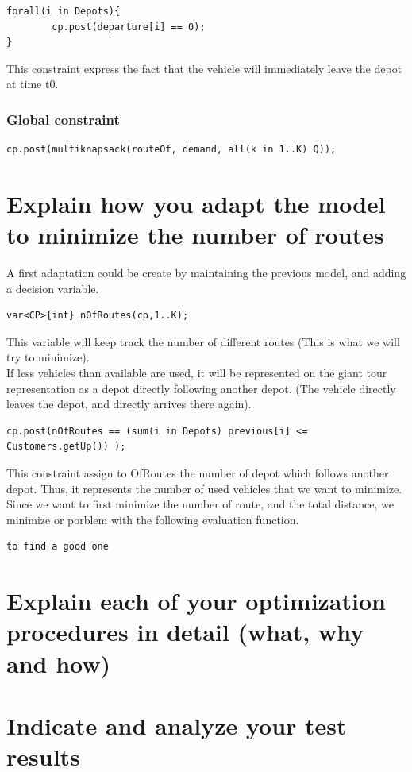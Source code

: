 \documentclass[a4paper ,12pt,french]{article}
\begin{document}
		
\begin{verbatim}
forall(i in Depots){
        cp.post(departure[i] == 0);
}
\end{verbatim}
This constraint express the fact that the vehicle will immediately leave the depot at time t0.


\subsubsection*{Global constraint}
\begin{verbatim}
cp.post(multiknapsack(routeOf, demand, all(k in 1..K) Q));
\end{verbatim}


\section{Explain how you adapt the model to minimize the number of routes}

A first adaptation could be create by maintaining the previous model, and adding a decision variable. 
\begin{verbatim}
var<CP>{int} nOfRoutes(cp,1..K);
\end{verbatim} 
This variable will keep track the number of different routes (This is what we will try to minimize).\\

If less vehicles than available are used, it will be represented on the giant tour representation as a depot directly following another depot. (The vehicle directly leaves the depot, and directly arrives there again).

\begin{verbatim}
cp.post(nOfRoutes == (sum(i in Depots) previous[i] <= Customers.getUp()) );
\end{verbatim}
This constraint assign to OfRoutes the number of depot which follows another depot. Thus, it represents the number of used vehicles that we want to minimize.\\

Since we want to first minimize the number of route, and the total distance, we minimize or porblem with the following evaluation function.
\begin{verbatim}
to find a good one
\end{verbatim}

\section{Explain each of your optimization procedures in detail (what, why and how)}

\section{Indicate and analyze your test results}
\end{document}
